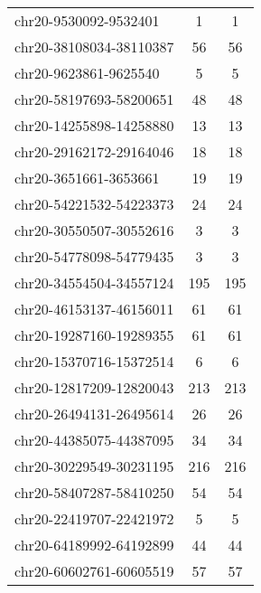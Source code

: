 \begin{longtable}{lSS}
	chr20-9530092-9532401   & 1      & 1                                         \\
	chr20-38108034-38110387 & 56     & 56                                        \\
	chr20-9623861-9625540   & 5      & 5                                         \\
	chr20-58197693-58200651 & 48     & 48                                        \\
	chr20-14255898-14258880 & 13     & 13                                        \\
	chr20-29162172-29164046 & 18     & 18                                        \\
	chr20-3651661-3653661   & 19     & 19                                        \\
	chr20-54221532-54223373 & 24     & 24                                        \\
	chr20-30550507-30552616 & 3      & 3                                         \\
	chr20-54778098-54779435 & 3      & 3                                         \\
	chr20-34554504-34557124 & 195    & 195                                       \\
	chr20-46153137-46156011 & 61     & 61                                        \\
	chr20-19287160-19289355 & 61     & 61                                        \\
	chr20-15370716-15372514 & 6      & 6                                         \\
	chr20-12817209-12820043 & 213    & 213                                       \\
	chr20-26494131-26495614 & 26     & 26                                        \\
	chr20-44385075-44387095 & 34     & 34                                        \\
	chr20-30229549-30231195 & 216    & 216                                       \\
	chr20-58407287-58410250 & 54     & 54                                        \\
	chr20-22419707-22421972 & 5      & 5                                         \\
	chr20-64189992-64192899 & 44     & 44                                        \\
	chr20-60602761-60605519 & 57     & 57                                        \\

\end{longtable}
